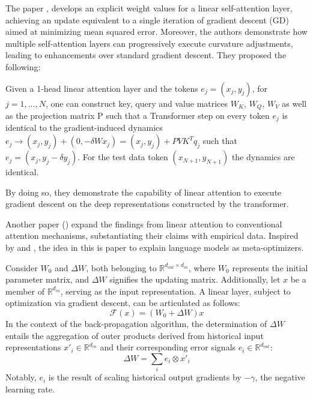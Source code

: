 \documentclass[runningheads]{llncs}
\begin{document}
The paper \cite{pmlr-v202-von-oswald23a}, develops an explicit weight values for a linear self-attention layer, achieving an update equivalent to a single iteration of gradient descent (GD) aimed at minimizing mean squared error. Moreover, the authors demonstrate how multiple self-attention layers can progressively execute curvature adjustments, leading to enhancements over standard gradient descent.
They proposed the following:

Given a 1-head linear attention layer and
the tokens $e_{j} = (x_{j},y_{j})$, for $j = 1, . . . , N$, one can construct key, query and value matrices $W_{K}$, $W_{Q}$, $W_{V}$ as well
as the projection matrix P such that a Transformer step on 
every token $e_j$ is identical to the gradient-induced dynamics $e_j \rightarrow (x_j , y_j ) + (0, - \delta W x_j ) = (x_j , y_j ) + PVK^{T}q_j$
such that $e_j = (x_j , y_j - \delta y_j )$. For the test data token
$(x_{N+1}, y_{N+1})$ the dynamics are identical.

By doing so, they demonstrate the capability of linear attention to execute gradient descent on the deep representations constructed by the transformer.


Another paper (\cite{2022arXiv221210559D}) expand the findings from linear attention to conventional attention mechanisms, substantiating their claims with empirical data.
Inspired by \cite{Aizerman2019TheoreticalFO} and \cite{unknown}, the idea in this is paper to explain language models as meta-optimizers.

Consider $W_0$ and $\Delta W$, both belonging to $\mathbb{R}^{d_{out} \times d_{in}}$, where $W_0$ represents the initial parameter matrix, and $\Delta W$ signifies the updating matrix. Additionally, let $x$ be a member of $\mathbb{R}^{d_{in}}$, serving as the input representation. A linear layer, subject to optimization via gradient descent, can be articulated as follows:
\begin{equation}
  \mathcal{F}(x) = (W_0 + \Delta W)x \label{eq:2}
\end{equation}
In the context of the back-propagation algorithm, the determination of $\Delta W$ entails the aggregation of outer products derived from historical input representations $x'_i \in \mathbb{R}^{d_{in}}$ and their corresponding error signals $e_i \in \mathbb{R}^{d_{out}}$:
\begin{equation}
  \Delta W = \sum_{i} e_i \otimes x'_i \label{eq:3}
\end{equation}
Notably, $e_i$ is the result of scaling historical output gradients by $-\gamma$, the negative learning rate.
\end{document}
